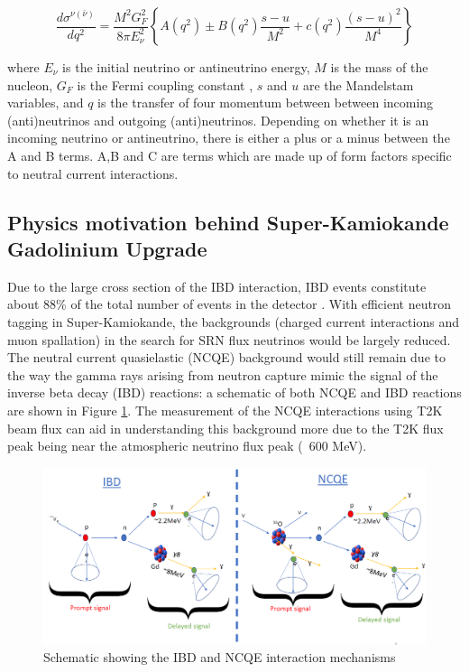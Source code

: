\begin{equation}
\frac{d \sigma^{\nu(\bar{\nu})}}{d q^{2}}=\frac{M^{2} G_{F}^{2}}{8 \pi E_{\nu}^{2}}\left\{A\left(q^{2}\right) \pm B\left(q^{2}\right) \frac{s-u}{M^{2}}+c\left(q^{2}\right) \frac{(s-u)^{2}}{M^{4}}\right\}
\label{eq:NCQExsec}
\end{equation}
    
where $E_{\nu}$ is the initial neutrino or antineutrino energy, $M$ is the mass of the nucleon, $G_{F}$ is the Fermi coupling constant \cite{van2000precise}, $s$ and $u$ are the Mandelstam variables, and $q$ is the transfer of four momentum between between incoming (anti)neutrinos and outgoing (anti)neutrinos. Depending on whether it is an incoming neutrino or antineutrino, there is either a plus or a minus between the A and B terms. A,B and C are terms which are made up of form factors specific to neutral current interactions.


\subsection{Physics motivation behind Super-Kamiokande Gadolinium Upgrade}

Due to the large cross section of the IBD interaction, IBD events constitute about 88\% of the total number of events in the detector \cite{marti_evaluation_2020}. With efficient neutron tagging in Super-Kamiokande, the backgrounds (charged current interactions and muon spallation) in the search for SRN flux neutrinos would be largely reduced. The neutral current quasielastic (NCQE) background would still remain due to the way the gamma rays arising from neutron capture mimic the signal of the inverse beta decay (IBD) reactions: a schematic of both NCQE and IBD reactions are shown in Figure \ref{fig:NCQE_IBD}. The measurement of the NCQE interactions using T2K beam flux can aid in understanding this background more due to the T2K flux peak being near the atmospheric neutrino flux peak (~600 MeV). 


\begin{figure}
    \includegraphics[width=\textwidth]{Figures/schematic.png}
\caption{Schematic showing the IBD and NCQE interaction mechanisms}
\label{fig:NCQE_IBD}
\end{figure}


